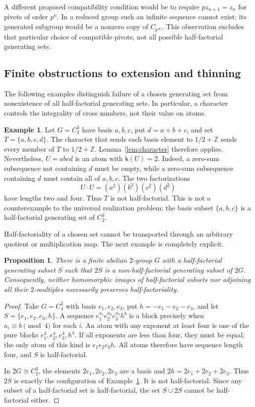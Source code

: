 \documentclass[11pt,reqno]{amsart}
\numberwithin{equation}{section}
\newtheorem{proposition}[theorem]{Proposition}
\theoremstyle{definition}
\newtheorem{example}[theorem]{Example}
\theoremstyle{remark}
\newcommand{\Z}{\mathbb Z}
\begin{document}
A different proposed compatibility condition would be to require
$pz_{n+1}=z_n$ for pivots of order $p^n$. In a reduced group such
an infinite sequence cannot exist: its generated subgroup would
be a nonzero copy of $C_{p^\infty}$. This observation excludes
that particular choice of compatible pivots, not all possible
half-factorial generating sets.

\subsection{Finite obstructions to extension and thinning}

The following examples distinguish failure of a chosen generating
set from nonexistence of all half-factorial generating sets. In
particular, a character controls the integrality of cross numbers,
not their value on atoms.

\begin{example}\label{ex:weak}
Let $G=C_2^3$ have basis $a,b,c$, put $d=a+b+c$, and set
$T=\{a,b,c,d\}$. The character that sends each basis element to
$1/2+\Z$ sends every member of $T$ to $1/2+\Z$.
Lemma~\ref{lem:character} therefore applies. Nevertheless,
$U=abcd$ is an atom with $\mathsf k(U)=2$. Indeed, a zero-sum
subsequence not containing $d$ must be empty, while a zero-sum
subsequence containing $d$ must contain all of $a,b,c$.
The two factorizations
\[
 U\cdot U=(a^2)(b^2)(c^2)(d^2)
\]
have lengths two and four. Thus $T$ is not half-factorial.
This is not a counterexample to the universal realization problem: the
basis subset $\{a,b,c\}$ is a half-factorial generating set of
$C_2^3$.
\end{example}

Half-factoriality of a chosen set cannot be transported through
an arbitrary quotient or multiplication map. The next example is
completely explicit.

\begin{proposition}\label{prop:doubling}
There is a finite abelian $2$-group $G$ with a half-factorial
generating subset $S$ such that $2S$ is a non-half-factorial
generating subset of $2G$. Consequently, neither homomorphic
images of half-factorial subsets nor adjoining all their
$2$-multiples necessarily preserves half-factoriality.
\end{proposition}

\begin{proof}
Take $G=C_4^3$ with basis $e_1,e_2,e_3$, put
$h=-e_1-e_2-e_3$, and let $S=\{e_1,e_2,e_3,h\}$.
A sequence $e_1^{a_1}e_2^{a_2}e_3^{a_3}h^b$ is a block
precisely when $a_i\equiv b\pmod4$ for each $i$. An atom with
any exponent at least four is one of the pure blocks
$e_1^4,e_2^4,e_3^4,h^4$. If all exponents are less than four,
they must be equal; the only atom of this kind is
$e_1e_2e_3h$. All atoms therefore have sequence length four, and
$S$ is half-factorial.

In $2G\cong C_2^3$, the elements $2e_1,2e_2,2e_3$ are a basis
and $2h=2e_1+2e_2+2e_3$. Thus $2S$ is exactly the configuration
of Example~\ref{ex:weak}. It is not half-factorial. Since any
subset of a half-factorial set is half-factorial, the set
$S\cup2S$ cannot be half-factorial either.
\end{proof}
\end{document}
